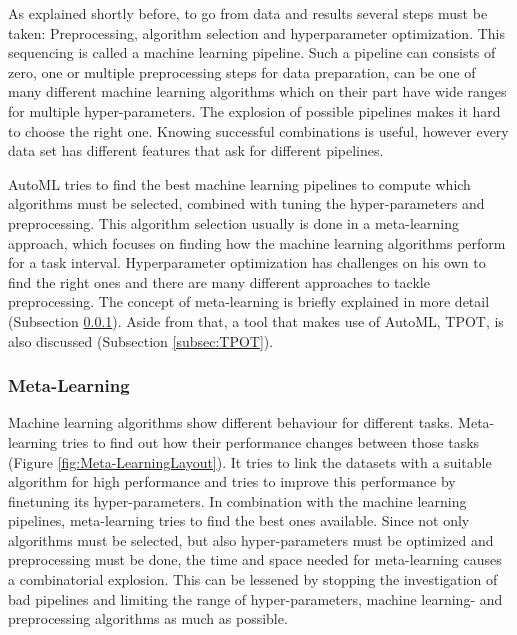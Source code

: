 	As explained shortly before, to go from data and results several steps must be taken: Preprocessing, algorithm selection and hyperparameter optimization. This sequencing is called a machine learning pipeline. Such a pipeline can consists of zero, one or multiple preprocessing steps for data preparation, can be one of many different machine learning algorithms which on their part have wide ranges for multiple hyper-parameters. The explosion of possible pipelines makes it hard to choose the right one. Knowing successful combinations is useful, however every data set has different features that ask for different pipelines\cite{Gijsbers2017Thesis}.
	
	AutoML tries to find the best machine learning pipelines to compute which algorithms must be selected, combined with tuning the hyper-parameters and preprocessing. This algorithm selection usually is done in a meta-learning approach, which focuses on finding how the machine learning algorithms perform for a task interval. Hyperparameter optimization has challenges on his own to find the right ones and there are many different approaches to tackle preprocessing. The concept of meta-learning is briefly explained in more detail (Subsection \ref{subsec:Meta-Learning}). Aside from that, a tool that makes use of AutoML, TPOT, is also discussed (Subsection \ref{subsec:TPOT}). 	
	
	
	\subsubsection{Meta-Learning}
	\label{subsec:Meta-Learning}
	
Machine learning algorithms show different behaviour for different tasks. Meta-learning tries to find out how their performance changes between those tasks (Figure \ref{fig:Meta-LearningLayout}). It tries to link the datasets with a suitable algorithm for high performance and tries to improve this performance by finetuning its hyper-parameters. In combination with the machine learning pipelines, meta-learning tries to find the best ones available. Since not only algorithms must be selected, but also hyper-parameters must be optimized and preprocessing must be done, the time and space needed for meta-learning causes a combinatorial explosion. This can be lessened by stopping the investigation of bad pipelines and limiting the range of hyper-parameters, machine learning- and preprocessing algorithms as much as possible. 

